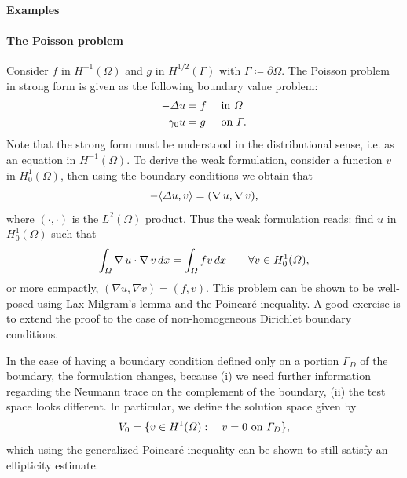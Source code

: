 \paragraph{Examples}
\paragraph{The Poisson problem} Consider $f$ in $H^{-1}(\Omega)$ and $g$ in $H^{1/2}(\Gamma)$ with $\Gamma\coloneqq \partial\Omega$. The Poisson problem in strong form is given as the following boundary value problem: 
\begin{equation*}
    \begin{aligned}
        -\Delta u  &= f &&\text{ in }\Omega\\
        \gamma_0 u &= g &&\text{ on }\Gamma.
    \end{aligned}
\end{equation*}
Note that the strong form must be understood in the distributional sense, i.e. as an equation in $H^{-1}(\Omega)$. To derive the weak formulation, consider a function $v$ in $H_0^1(\Omega)$, then using the boundary conditions we obtain that 
\begin{equation}
    -\langle \Delta u,v\rangle = (\operatorname{\nabla} u, \operatorname{\nabla} v),
\end{equation}
where $(\cdot, \cdot)$ is the $L^2(\Omega)$ product. Thus the weak formulation reads: find $u$ in $H_0^1(\Omega)$ such that 
\begin{equation}
    \int_\Omega \operatorname{\nabla} u\cdot \operatorname{\nabla} v\,dx = \int_\Omega fv\, dx \qquad \forall v\in H_0^1(\Omega),
\end{equation}
or more compactly, $(\nabla u, \nabla v) = (f, v)$. This problem can be shown to be well-posed using Lax-Milgram's lemma and the Poincaré inequality. A good exercise is to extend the proof to the case of non-homogeneous Dirichlet boundary conditions.

In the case of having a boundary condition defined only on a portion $\Gamma_D$ of the boundary, the formulation changes, because (i) we need further information regarding the Neumann trace on the complement of the boundary, (ii) the test space looks different. In particular, we define the solution space given by 
\begin{equation}\label{eq:def-V0}
    V_0 = \{v\in H^1(\Omega): \quad v = 0 \text{ on } \Gamma_D\},
\end{equation}
which using the generalized Poincaré inequality can be shown to still satisfy an ellipticity estimate. 

